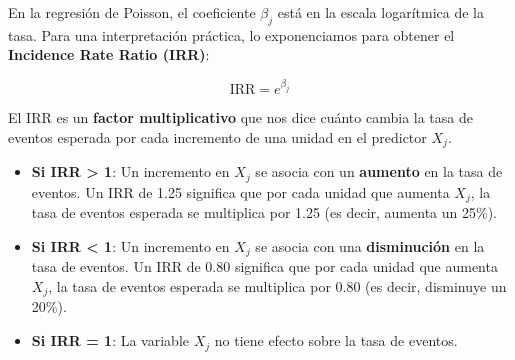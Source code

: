 \documentclass[
  letterpaper,
  DIV=11,
  numbers=noendperiod]{scrreprt}
\providecommand{\tightlist}{%
  \setlength{\itemsep}{0pt}\setlength{\parskip}{0pt}}
\begin{document}
\begin{tcolorbox}[enhanced jigsaw, breakable, toprule=.15mm, bottomtitle=1mm, coltitle=black, colbacktitle=quarto-callout-important-color!10!white, titlerule=0mm, opacitybacktitle=0.6, bottomrule=.15mm, toptitle=1mm, title=\textcolor{quarto-callout-important-color}{\faExclamation}\hspace{0.5em}{Interpretando el coeficiente de Poisson: Incidence Rate Ratio (IRR)}, arc=.35mm, rightrule=.15mm, opacityback=0, colframe=quarto-callout-important-color-frame, leftrule=.75mm, left=2mm, colback=white]

En la regresión de Poisson, el coeficiente \(\beta_j\) está en la escala
logarítmica de la tasa. Para una interpretación práctica, lo
exponenciamos para obtener el \textbf{Incidence Rate Ratio (IRR)}:

\[
\text{IRR} = e^{\beta_j}
\]

El IRR es un \textbf{factor multiplicativo} que nos dice cuánto cambia
la tasa de eventos esperada por cada incremento de una unidad en el
predictor \(X_j\).

\begin{itemize}
\tightlist
\item
  \textbf{Si IRR \textgreater{} 1}: Un incremento en \(X_j\) se asocia
  con un \textbf{aumento} en la tasa de eventos. Un IRR de 1.25
  significa que por cada unidad que aumenta \(X_j\), la tasa de eventos
  esperada se multiplica por 1.25 (es decir, aumenta un 25\%).
\item
  \textbf{Si IRR \textless{} 1}: Un incremento en \(X_j\) se asocia con
  una \textbf{disminución} en la tasa de eventos. Un IRR de 0.80
  significa que por cada unidad que aumenta \(X_j\), la tasa de eventos
  esperada se multiplica por 0.80 (es decir, disminuye un 20\%).
\item
  \textbf{Si IRR = 1}: La variable \(X_j\) no tiene efecto sobre la tasa
  de eventos.
\end{itemize}

\end{tcolorbox}
\end{document}
